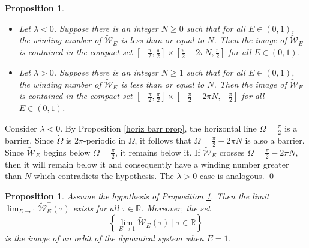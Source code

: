\documentclass[11 pt]{article}
\newtheorem{prop}[thm]{Proposition}%
\renewcommand\l{\lambda}
\renewcommand\({\left(}
\renewcommand\){\right)}
\newcommand\wt{\widetilde}
\newcommand\<{\langle}
\renewcommand\>{\rangle}
\renewcommand\l{\lambda}
\newcommand\8{\infty}
\newcommand{\R}{\mathbb R}
\newcommand{\mc}{\mathcal}
\begin{document}
\medskip
\medskip

\newpage

\begin{prop}\label{in compact prop} \: $\phantom{nix}$
\begin{itemize}
\item[$\bullet$] Let $\l < 0$. Suppose there is an integer $N \geq 0$ such that for all $E \in (0,1)$, the winding number of $\wt{\mc{W}}_E^-$ is less than or equal to $N$. Then the image of $\wt{\mc{W}}_E^-$ is contained in the compact set $[-\frac{\pi}{2}, \frac{\pi}{2}] \times [\frac{\pi}{2} - 2 \pi N, \frac{\pi}{2}]$ for all $E \in (0,1)$.
\item[$\bullet$] Let $\l > 0$. Suppose there is an integer $N \geq 1$ such that for all $E \in (0,1)$, the winding number of $\wt{\mc{W}}_E^-$ is less than or equal to $N$. Then the image of $\wt{\mc{W}}_E^-$ is contained in the compact set $[-\frac{\pi}{2}, \frac{\pi}{2}] \times [-\frac{\pi}{2} - 2 \pi N, -\frac{\pi}{2}]$ for all $E \in (0,1)$.
\end{itemize}
\end{prop}

\proof
Consider $\l < 0$. By Proposition \ref{horiz barr prop}, the horizontal line $\Omega = \frac{\pi}{2}$ is a barrier. Since $\dot{\Omega}$ is $2\pi$-periodic in $\Omega$, it follows that $\Omega = \frac{\pi}{2} - 2 \pi N$ is also a barrier. Since $\wt{\mc{W}}_E^-$ begins below $\Omega = \frac{\pi}{2}$, it remains below it. If $\wt{\mc{W}}_E^-$ crosses $\Omega = \frac{\pi}{2} - 2 \pi N$, then it will remain below it and consequently have a winding number greater than $N$ which contradicts the hypothesis. The $\l > 0$ case is analogous. 
\qed

\medskip
\medskip

\begin{prop}\label{limit orbit prop}
Assume the hypothesis of Proposition \emph{\ref{in compact prop}}. Then the limit $\displaystyle\lim_{E \to 1}\wt{\mc{W}}_E^-(\tau)$ exists for all $\tau \in \R$. Moreover, the set
\[
\left\{\lim_{E \to 1}\wt{\mc{W}}_E^-(\tau) \mid \tau \in \R\right\}
\]
is the image of an orbit of the dynamical system when $E = 1$. 
\end{prop}
\end{document}

